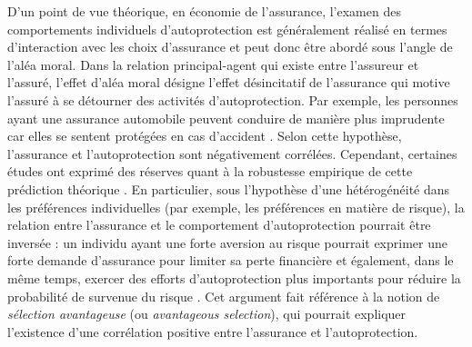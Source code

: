 \begin{Article}
\begin{refsection}[Mouminoux]
D'un point de vue théorique, en économie de l'assurance, l'examen des comportements individuels d'autoprotection est généralement réalisé en termes d'interaction avec les choix d'assurance et peut donc être abordé sous l'angle de l'aléa moral. Dans la relation principal-agent qui existe entre l'assureur et l'assuré, l'effet d'aléa moral désigne l'effet désincitatif de l'assurance qui motive l'assuré à se détourner des activités d'autoprotection. Par exemple, les personnes ayant une assurance automobile peuvent conduire de manière plus imprudente car elles se sentent protégées en cas d'accident \parencite{Arrow1963,Arrow1968,p68}. Selon cette hypothèse, l'assurance et l'autoprotection sont négativement corrélées. Cependant, certaines études ont exprimé des réserves quant à la robustesse empirique de cette prédiction théorique \parencite{cs00}. En particulier, sous l'hypothèse d'une hétérogénéité dans les préférences individuelles (par exemple, les préférences en matière de risque), la relation entre l'assurance et le comportement d'autoprotection pourrait être inversée : un individu ayant une forte aversion au risque pourrait exprimer une forte demande d'assurance pour limiter sa perte financière et également, dans le même temps, exercer des efforts d'autoprotection plus importants pour réduire la probabilité de survenue du risque \parencite{cjss06,dh09,dw01,h90,h92}. Cet argument fait référence à la notion de \textit{sélection avantageuse} (ou \textit{avantageous selection}), qui pourrait expliquer l'existence d'une corrélation positive entre l'assurance et l'autoprotection.


\end{refsection}
\end{Article}
